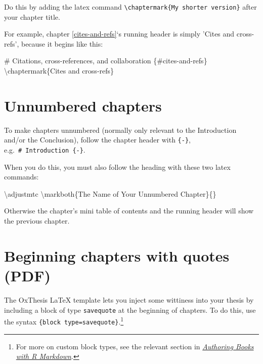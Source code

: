 \documentclass[a4paper, nobind]{templates/ociamthesis}
\newenvironment{Shaded}{\begin{snugshade}}{\end{snugshade}}
\newcommand{\FunctionTok}[1]{\textcolor[rgb]{0.00,0.00,0.00}{#1}}
\newcommand{\NormalTok}[1]{#1}
\renewenvironment{Shaded}
{
  \vspace{10pt}%
  \begin{snugshade}%
}{%
  \end{snugshade}%
  \vspace{8pt}%
}
\begin{document}
Do this by adding the latex command \texttt{\textbackslash{}chaptermark\{My\ shorter\ version\}} after your chapter title.

For example, chapter \ref{cites-and-refs}`s running header is simply 'Cites and cross-refs', because it begins like this:

\begin{Shaded}
\begin{Highlighting}[]
\FunctionTok{\# Citations, cross{-}references, and collaboration \{\#cites{-}and{-}refs\} }
\NormalTok{\textbackslash{}chaptermark\{Cites and cross{-}refs\}}
\end{Highlighting}
\end{Shaded}

\hypertarget{unnumbered-chapters}{%
\section{Unnumbered chapters}\label{unnumbered-chapters}}

To make chapters unnumbered (normally only relevant to the Introduction and/or the Conclusion), follow the chapter header with \texttt{\{-\}}, e.g.~\texttt{\#\ Introduction\ \{-\}}.

When you do this, you must also follow the heading with these two latex commands:

\begin{Shaded}
\begin{Highlighting}[]
\FunctionTok{\textbackslash{}adjustmtc}
\FunctionTok{\textbackslash{}markboth}\NormalTok{\{The Name of Your Unnumbered Chapter\}\{\}}
\end{Highlighting}
\end{Shaded}

Otherwise the chapter's mini table of contents and the running header will show the previous chapter.

\hypertarget{beginning-chapters-with-quotes-pdf}{%
\section{Beginning chapters with quotes (PDF)}\label{beginning-chapters-with-quotes-pdf}}

The OxThesis LaTeX template lets you inject some wittiness into your thesis by including a block of type \texttt{savequote} at the beginning of chapters.
To do this, use the syntax \texttt{\textasciigrave{}\textasciigrave{}\textasciigrave{}\{block\ type=\textquotesingle{}savequote\textquotesingle{}\}}.\footnote{For more on custom block types, see the relevant section in \href{https://bookdown.org/yihui/bookdown/custom-blocks.html}{\emph{Authoring Books with R Markdown}}.}
\end{document}
